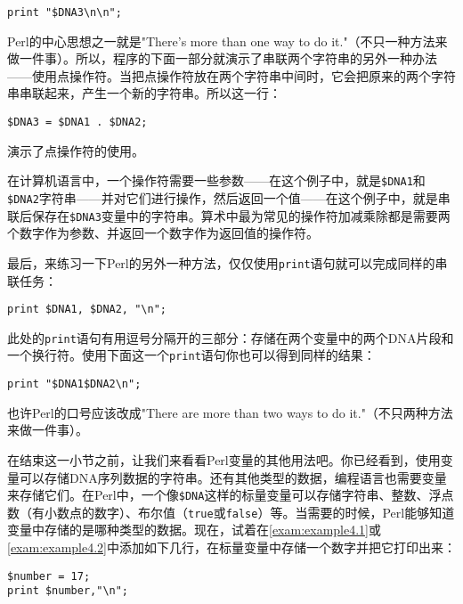 \begin{lstlisting}
print "$DNA3\n\n";
\end{lstlisting}

Perl的中心思想之一就是"There's more than one way to do
it."（不只一种方法来做一件事）。所以，程序的下面一部分就演示了串联两个字符串的另外一种办法——使用点操作符。当把点操作符放在两个字符串中间时，它会把原来的两个字符串串联起来，产生一个新的字符串。所以这一行：

\begin{lstlisting}
$DNA3 = $DNA1 . $DNA2;
\end{lstlisting}
演示了点操作符的使用。

\begin{adjustwidth}{2cm}{2cm}
\noindent
在计算机语言中，一个操作符需要一些参数——在这个例子中，就是\verb|$DNA1|和\verb|$DNA2|字符串——并对它们进行操作，然后返回一个值——在这个例子中，就是串联后保存在\verb|$DNA3|变量中的字符串。算术中最为常见的操作符加减乘除都是需要两个数字作为参数、并返回一个数字作为返回值的操作符。
\end{adjustwidth}

最后，来练习一下Perl的另外一种方法，仅仅使用\verb|print|语句就可以完成同样的串联任务：

\begin{lstlisting}
print $DNA1, $DNA2, "\n";
\end{lstlisting}

此处的\verb|print|语句有用逗号分隔开的三部分：存储在两个变量中的两个DNA片段和一个换行符。使用下面这一个\verb|print|语句你也可以得到同样的结果：

\begin{lstlisting}
print "$DNA1$DNA2\n";
\end{lstlisting}

也许Perl的口号应该改成"There are more than two ways to do it."（不只两种方法来做一件事）。

在结束这一小节之前，让我们来看看Perl变量的其他用法吧。你已经看到，使用变量可以存储DNA序列数据的字符串。还有其他类型的数据，编程语言也需要变量来存储它们。在Perl中，一个像\verb|$DNA|这样的标量变量可以存储字符串、整数、浮点数（有小数点的数字）、布尔值（\verb|true|或\verb|false|）等。当需要的时候，Perl能够知道变量中存储的是哪种类型的数据。现在，试着在\autoref{exam:example4.1}或\autoref{exam:example4.2}中添加如下几行，在标量变量中存储一个数字并把它打印出来：

\begin{lstlisting}
$number = 17;
print $number,"\n";
\end{lstlisting}

